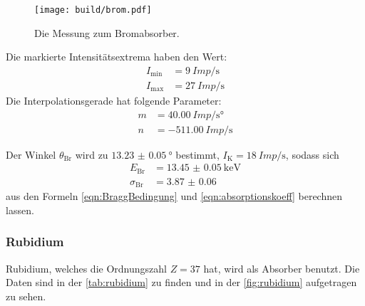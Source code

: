     \begin{figure}
      \centering
      \texttt{[image: build/brom.pdf]}
      \caption{Die Messung zum Bromabsorber.}
      \label{fig:brom}
    \end{figure}

    \noindent Die markierte Intensitätsextrema haben den Wert:
    \begin{align*}
      I_{\text{min}} &= \SI{9}{Imp\per\second}\\
      I_{\text{max}} &= \SI{27}{Imp\per\second}
    \end{align*}
    Die Interpolationsgerade hat folgende Parameter:
    \begin{align*}
      m & = \SI{40.00}{Imp\per\second\degree}\\
      n & = \SI{-511.00}{Imp\per\second}
    \end{align*}

    \noindent Der Winkel $\theta_{\text{Br}} $ wird zu $\SI{13.23(5)}{\degree}$ bestimmt, $I_{\text{K}} = \SI{18}{Imp\per\second}$, sodass sich 
    \begin{align*}
      E_{\text{Br}} &= \SI{13.45(5)}{\kilo\electronvolt}\\
      \sigma_{\text{Br}} &= \num{3.87(6)}
    \end{align*} 
    aus den Formeln \eqref{eqn:BraggBedingung} und \eqref{eqn:absorptionskoeff} berechnen lassen.

  \subsubsection{Rubidium}
    Rubidium, welches die Ordnungszahl $Z = \num{37}$ hat, wird als Absorber benutzt. Die Daten sind in der \autoref{tab:rubidium} zu finden und in der \autoref{fig:rubidium}
    aufgetragen zu sehen.

